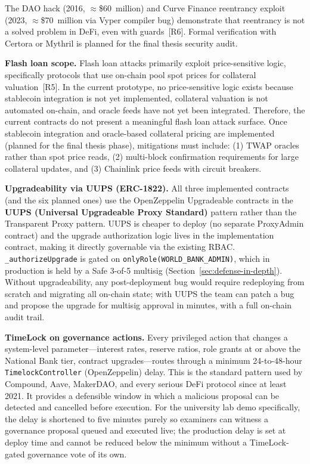 \documentclass[12pt,a4paper]{report}
\begin{document}
The DAO hack (2016, $\approx$\$60~million) and Curve Finance reentrancy exploit (2023, $\approx$\$70~million via Vyper compiler bug) demonstrate that reentrancy is not a solved problem in DeFi, even with guards~[R6]. Formal verification with Certora or Mythril is planned for the final thesis security audit.

\textbf{Flash loan scope.} Flash loan attacks primarily exploit price-sensitive logic, specifically protocols that use on-chain pool spot prices for collateral valuation~[R5]. In the current prototype, no price-sensitive logic exists because stablecoin integration is not yet implemented, collateral valuation is not automated on-chain, and oracle feeds have not yet been integrated. Therefore, the current contracts do not present a meaningful flash loan attack surface. Once stablecoin integration and oracle-based collateral pricing are implemented (planned for the final thesis phase), mitigations must include: (1) TWAP oracles rather than spot price reads, (2) multi-block confirmation requirements for large collateral updates, and (3) Chainlink price feeds with circuit breakers.

\textbf{Upgradeability via UUPS (ERC-1822).} All three implemented contracts (and the six planned ones) use the OpenZeppelin Upgradeable contracts in the \textbf{UUPS (Universal Upgradeable Proxy Standard)} pattern rather than the Transparent Proxy pattern. UUPS is cheaper to deploy (no separate ProxyAdmin contract) and the upgrade authorization logic lives in the implementation contract, making it directly governable via the existing RBAC. \texttt{\_authorizeUpgrade} is gated on \texttt{onlyRole(WORLD\_BANK\_ADMIN)}, which in production is held by a Safe 3-of-5 multisig (Section~\ref{sec:defense-in-depth}). Without upgradeability, any post-deployment bug would require redeploying from scratch and migrating all on-chain state; with UUPS the team can patch a bug and propose the upgrade for multisig approval in minutes, with a full on-chain audit trail.

\textbf{TimeLock on governance actions.} Every privileged action that changes a system-level parameter---interest rates, reserve ratios, role grants at or above the National Bank tier, contract upgrades---routes through a minimum 24-to-48-hour \texttt{TimelockController} (OpenZeppelin) delay. This is the standard pattern used by Compound, Aave, MakerDAO, and every serious DeFi protocol since at least 2021. It provides a defensible window in which a malicious proposal can be detected and cancelled before execution. For the university lab demo specifically, the delay is shortened to five minutes purely so examiners can witness a governance proposal queued and executed live; the production delay is set at deploy time and cannot be reduced below the minimum without a TimeLock-gated governance vote of its own.
\end{document}
